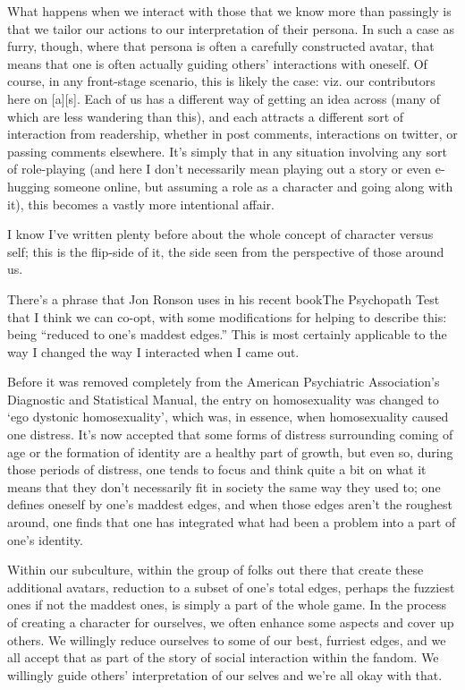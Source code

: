 What happens when we interact with those that we know more than passingly is that we tailor our actions to our interpretation of their persona. In such a case as furry, though, where that persona is often a carefully constructed avatar, that means that one is often actually guiding others' interactions with oneself. Of course, in any front-stage scenario, this is likely the case: viz. our contributors here on {[}a{]}{[}s{]}. Each of us has a different way of getting an idea across (many of which are less wandering than this), and each attracts a different sort of interaction from readership, whether in post comments, interactions on twitter, or passing comments elsewhere. It's simply that in any situation involving any sort of role-playing (and here I don't necessarily mean playing out a story or even e-hugging someone online, but assuming a role as a character and going along with it), this becomes a vastly more intentional affair.

I know I've written plenty before about the whole concept of character versus self; this is the flip-side of it, the side seen from the perspective of those around us.

There's a phrase that Jon Ronson uses in his recent bookThe Psychopath Test that I think we can co-opt, with some modifications for helping to describe this: being ``reduced to one's maddest edges.'' This is most certainly applicable to the way I changed the way I interacted when I came out.

Before it was removed completely from the American Psychiatric Association's Diagnostic and Statistical Manual, the entry on homosexuality was changed to `ego dystonic homosexuality', which was, in essence, when homosexuality caused one distress. It's now accepted that some forms of distress surrounding coming of age or the formation of identity are a healthy part of growth, but even so, during those periods of distress, one tends to focus and think quite a bit on what it means that they don't necessarily fit in society the same way they used to; one defines oneself by one's maddest edges, and when those edges aren't the roughest around, one finds that one has integrated what had been a problem into a part of one's identity.

Within our subculture, within the group of folks out there that create these additional avatars, reduction to a subset of one's total edges, perhaps the fuzziest ones if not the maddest ones, is simply a part of the whole game. In the process of creating a character for ourselves, we often enhance some aspects and cover up others. We willingly reduce ourselves to some of our best, furriest edges, and we all accept that as part of the story of social interaction within the fandom. We willingly guide others' interpretation of our selves and we're all okay with that.

